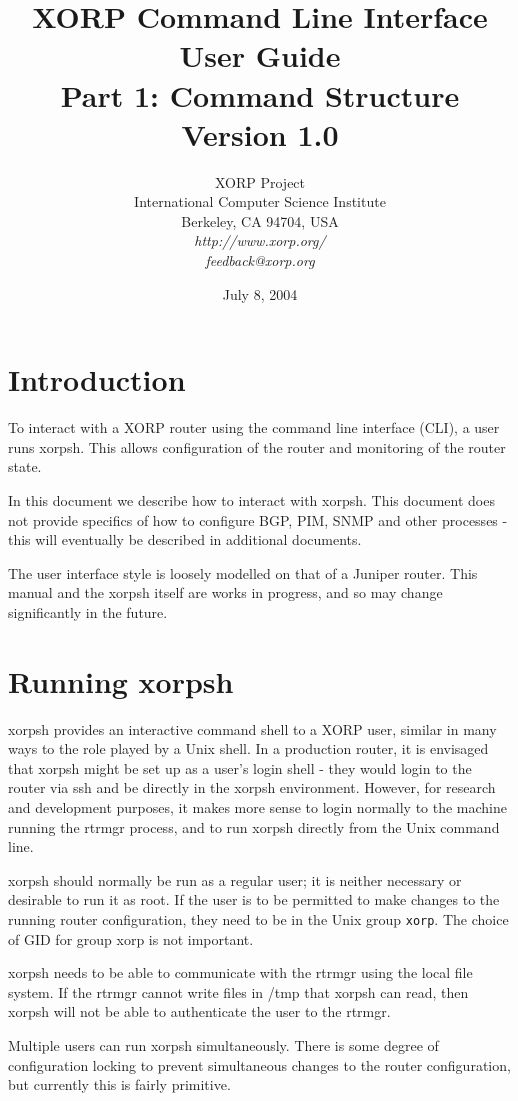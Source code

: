 \documentclass[11pt]{article}
\title{XORP Command Line Interface User Guide\\
Part 1: Command Structure \\
\vspace{1ex}
Version 1.0}
\author{ XORP Project					\\
	 International Computer Science Institute	\\
	 Berkeley, CA 94704, USA			\\
         {\it http://www.xorp.org/}			\\
	 {\it feedback@xorp.org}
}
\date{July 8, 2004}
\newcommand{\xorpsh}{{\sf\small xorpsh}\xspace}
\begin{document}
\maketitle

\section{Introduction}
To interact with a XORP router using the command line interface (CLI),
a user runs \xorpsh.  This allows configuration of the router and
monitoring of the router state.  

In this document we describe how to interact with \xorpsh.  This
document does not provide specifics of how to configure BGP, PIM, SNMP
and other processes - this will eventually be described in additional
documents.

The user interface style is loosely modelled on that of a Juniper
router.  This manual and the xorpsh itself are works in progress, and
so may change significantly in the future.

\section{Running xorpsh}
\xorpsh provides an interactive command shell to a XORP user, similar
in many ways to the role played by a Unix shell.  In a production
router, it is envisaged that \xorpsh might be set up as a user's login
shell - they would login to the router via ssh and be directly in the
\xorpsh environment.  However, for research and development purposes,
it makes more sense to login normally to the machine running the
rtrmgr process, and to run \xorpsh directly from the Unix command line.

\xorpsh should normally be run as a regular user; it is neither
necessary or desirable to run it as root.  If the user is to be
permitted to make changes to the running router configuration, they
need to be in the Unix group {\tt xorp}.  The choice of GID for group
xorp is not important.

\xorpsh needs to be able to communicate with the rtrmgr using the local
file system.  If the rtrmgr cannot write files in /tmp that \xorpsh
can read, then \xorpsh will not be able to authenticate the user to the
rtrmgr.

Multiple users can run \xorpsh simultaneously.  There is some degree of
configuration locking to prevent simultaneous changes to the router
configuration, but currently this is fairly primitive.
\end{document}
